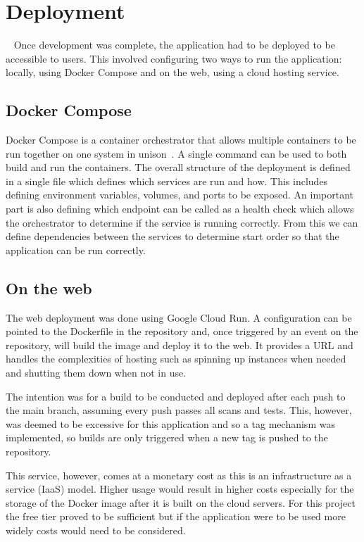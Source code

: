 \chapter{Deployment}~\label{cha:deployment}
Once development was complete, the application had to be deployed to be accessible to users. This involved configuring two ways to run the application: locally, using Docker Compose and on the web, using a cloud hosting service.

\section{Docker Compose}
Docker Compose is a container orchestrator that allows multiple containers to be run together on one system in unison~\cite{DockerCompose}. A single command can be used to both build and run the containers. The overall structure of the deployment is defined in a single file which defines which services are run and how. This includes defining environment variables, volumes, and ports to be exposed. An important part is also defining which endpoint can be called as a health check which allows the orchestrator to determine if the service is running correctly. From this we can define dependencies between the services to determine start order so that the application can be run correctly.

\section{On the web}
The web deployment was done using Google Cloud Run. A configuration can be pointed to the Dockerfile in the repository and, once triggered by an event on the repository, will build the image and deploy it to the web. It provides a URL and handles the complexities of hosting such as spinning up instances when needed and shutting them down when not in use.

The intention was for a build to be conducted and deployed after each push to the main branch, assuming every push passes all scans and tests. This, however, was deemed to be excessive for this application and so a tag mechanism was implemented, so builds are only triggered when a new tag is pushed to the repository.

This service, however, comes at a monetary cost as this is an infrastructure as a service (IaaS) model. Higher usage would result in higher costs especially for the storage of the Docker image after it is built on the cloud servers. For this project the free tier proved to be sufficient but if the application were to be used more widely costs would need to be considered.
